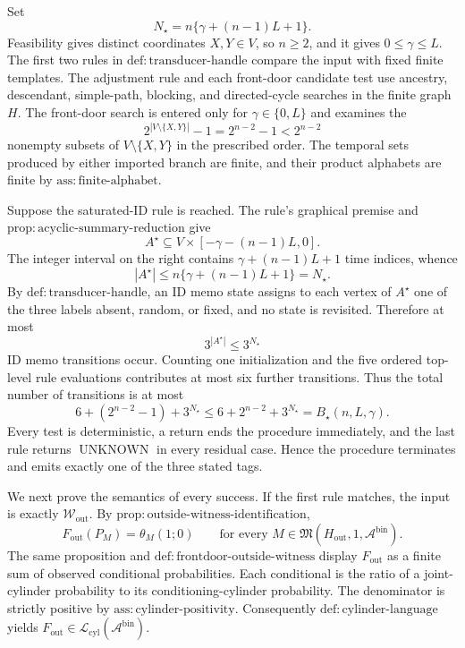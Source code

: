 Set
\[
N_\star=n\{\gamma+(n-1)L+1\}.
\]
Feasibility gives distinct coordinates \(X,Y\in V\), so \(n\geq 2\), and it gives \(0\leq\gamma\leq L\).  The first two rules in \(\mathrm{def:transducer\text{-}handle}\) compare the input with fixed finite templates.  The adjustment rule and each front-door candidate test use ancestry, descendant, simple-path, blocking, and directed-cycle searches in the finite graph \(H\).  The front-door search is entered only for \(\gamma\in\{0,L\}\) and examines the
\[
2^{|V\setminus\{X,Y\}|}-1=2^{n-2}-1<2^{n-2}
\]
nonempty subsets of \(V\setminus\{X,Y\}\) in the prescribed order.  The temporal sets produced by either imported branch are finite, and their product alphabets are finite by \(\mathrm{ass:finite\text{-}alphabet}\).

Suppose the saturated-ID rule is reached.  The rule's graphical premise and \(\mathrm{prop:acyclic\text{-}summary\text{-}reduction}\) give
\[
A^\star\subseteq V\times[-\gamma-(n-1)L,0].
\]
The integer interval on the right contains \(\gamma+(n-1)L+1\) time indices, whence
\[
|A^\star|\leq n\{\gamma+(n-1)L+1\}=N_\star.
\]
By \(\mathrm{def:transducer\text{-}handle}\), an ID memo state assigns to each vertex of \(A^\star\) one of the three labels absent, random, or fixed, and no state is revisited.  Therefore at most
\[
3^{|A^\star|}\leq 3^{N_\star}
\]
ID memo transitions occur.  Counting one initialization and the five ordered top-level rule evaluations contributes at most six further transitions.  Thus the total number of transitions is at most
\[
6+(2^{n-2}-1)+3^{N_\star}
\leq 6+2^{n-2}+3^{N_\star}
=B_\star(n,L,\gamma).
\]
Every test is deterministic, a return ends the procedure immediately, and the last rule returns \(\operatorname{UNKNOWN}\) in every residual case.  Hence the procedure terminates and emits exactly one of the three stated tags.

We next prove the semantics of every success.  If the first rule matches, the input is exactly \(\mathcal W_{\mathrm{out}}\).  By \(\mathrm{prop:outside\text{-}witness\text{-}identification}\),
\[
F_{\mathrm{out}}(P_M)=\theta_M(1;0)
\qquad
\text{for every }M\in\mathfrak M(H_{\mathrm{out}},1,\mathcal A^{\mathrm{bin}}).
\]
The same proposition and \(\mathrm{def:frontdoor\text{-}outside\text{-}witness}\) display \(F_{\mathrm{out}}\) as a finite sum of observed conditional probabilities.  Each conditional is the ratio of a joint-cylinder probability to its conditioning-cylinder probability.  The denominator is strictly positive by \(\mathrm{ass:cylinder\text{-}positivity}\).  Consequently \(\mathrm{def:cylinder\text{-}language}\) yields \(F_{\mathrm{out}}\in\mathcal L_{\mathrm{cyl}}(\mathcal A^{\mathrm{bin}})\).

